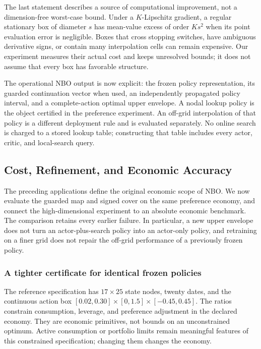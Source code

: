 The last statement describes a source of computational improvement, not a dimension-free worst-case bound. Under a $K$-Lipschitz gradient, a regular stationary box of diameter $s$ has mean-value excess of order $Ks^2$ when its point evaluation error is negligible. Boxes that cross stopping switches, have ambiguous derivative signs, or contain many interpolation cells can remain expensive. Our experiment measures their actual cost and keeps unresolved bounds; it does not assume that every box has favorable structure.

The operational NBO output is now explicit: the frozen policy representation, its guarded continuation vector when used, an independently propagated policy interval, and a complete-action optimal upper envelope. A nodal lookup policy is the object certified in the preference experiment. An off-grid interpolation of that policy is a different deployment rule and is evaluated separately. No online search is charged to a stored lookup table; constructing that table includes every actor, critic, and local-search query.



\subsection{Cost, Refinement, and Economic Accuracy}\label{sec:r9results}
The preceding applications define the original economic scope of NBO. We now evaluate the guarded map and signed cover on the same preference economy, and connect the high-dimensional experiment to an absolute economic benchmark. The comparison retains every earlier failure. In particular, a new upper envelope does not turn an actor-plus-search policy into an actor-only policy, and retraining on a finer grid does not repair the off-grid performance of a previously frozen policy.

\subsubsection{A tighter certificate for identical frozen policies}
The reference specification has $17\times25$ state nodes, twenty dates, and the continuous action box $[0.02,0.30]\times[0,1.5]\times[-0.45,0.45]$. The ratios constrain consumption, leverage, and preference adjustment in the declared economy. They are economic primitives, not bounds on an unconstrained optimum. Active consumption or portfolio limits remain meaningful features of this constrained specification; changing them changes the economy.

